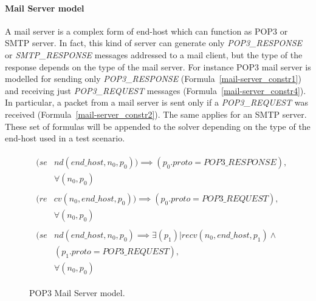 \paragraph{Mail Server model} A mail server is a complex form of end-host which can function as POP3 or SMTP server. In fact, this kind of server can generate only \textit{POP3\_RESPONSE} or \textit{SMTP\_RESPONSE} messages addressed to a mail client, but the type of the response depends on the type of the mail server. For instance POP3 mail server is modelled for sending only \textit{POP3\_RESPONSE} (Formula~\ref{mail-server_constr1}) and  receiving just \textit{POP3\_REQUEST} messages (Formula~\ref{mail-server_constr4}). In particular, a packet  from a mail server is sent only if a \textit{POP3\_REQUEST} was received (Formula~\ref{mail-server_constr2}). The same applies for an SMTP server. These set of formulas will be appended to the solver depending on the type of the end-host used in a test scenario. 
\begin{figure}[h]
	{\footnotesize
		\begin{subequations}
			\begin{align}
				\begin{split}
					\label{mail-server_constr1}
					(se& nd(end\_host , n_{0}, p_{0})) \implies  (p_{0}.proto = POP3\_RESPONSE ), \\
					& \forall (n_{0}, p_{0})
				\end{split} \\							
				\begin{split}
					\label{mail-server_constr4}
					(re& cv(n_{0}, end\_host, p_{0})) \implies (p_{0}.proto = POP3\_REQUEST ), \\
					& \forall (n_{0}, p_{0})
				\end{split}\\	
				\begin{split}
					\label{mail-server_constr2}
					(se& nd(end\_host , n_{0}, p_{0}) \implies \exists (p_{1}) | recv(n_{0}, end\_host, p_{1}) \wedge\\
					&    (p_{1}.proto = POP3\_REQUEST),\\
					& \forall (n_{0}, p_{0})
				\end{split} 
			\end{align}
		\end{subequations}
	}%
	\caption{POP3 Mail Server model.}
	\label{mail-server_model}
\end{figure}

